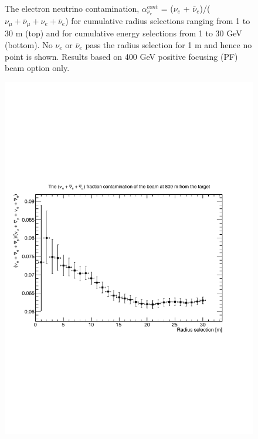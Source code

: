 \begin{figure}[htbp]
\begin{center}
      \caption{The electron neutrino contamination, $\alpha_{\nu_{e}}^{cont}$ = ($\nu_{e}$ + $\bar{\nu}_{e}$)/($\nu_{\mu} + \bar{\nu}_{\mu} + \nu_{e} + \bar{\nu}_{e}$) for cumulative radius selections ranging from 1 to 30 m (top) and for cumulative energy selections from 1 to 30 GeV (bottom). No $\nu_{e}$ or $\bar{\nu}_{e}$ pass the radius selection for 1 m and hence no point is shown. Results based on 400 GeV positive focusing (PF) beam option only.}
    \label{fig:nueContamination}
\end{center}
\end{figure}

\begin{figure}[htbp]
\begin{center}
 	\includegraphics[width=120mm]{Chapter3/figures/400GeV_PF_nueAndNueBarAndNuMuBarRatio_RadiusCuts.pdf}

\end{center}
\end{figure}
